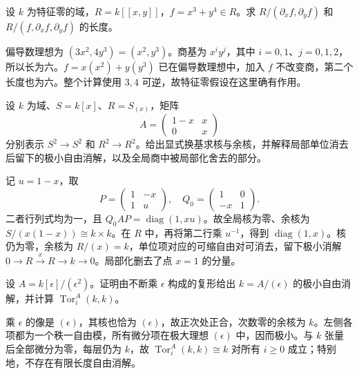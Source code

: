 \begin{exercise}\label{b3:ex:F-jacobian}
	设 \(k\) 为特征零的域，\(R=k[\![x,y]\!]\)，\(f=x^3+y^4\in R\)。求 \(R/(\partial_xf,\partial_yf)\) 和 \(R/(f,\partial_xf,\partial_yf)\) 的长度。
\end{exercise}
\begin{solution}
	偏导数理想为 \((3x^2,4y^3)=(x^2,y^3)\)。商基为 \(x^iy^j\)，其中 \(i=0,1\)、\(j=0,1,2\)，所以长为六。\(f=x(x^2)+y(y^3)\) 已在偏导数理想中，加入 \(f\) 不改变商，第二个长度也为六。整个计算使用 \(3,4\) 可逆，故特征零假设在这里确有作用。
\end{solution}

\begin{exercise}\label{b3:ex:F-module-unit}
	设 \(k\) 为域、\(S=k[x]\)、\(R=S_{(x)}\)，矩阵
	\[
		A=\begin{pmatrix}1-x&x\\0&x\end{pmatrix}
	\]
	分别表示 \(S^2\to S^2\) 和 \(R^2\to R^2\)。给出显式换基求核与余核，并解释局部单位消去后留下的极小自由消解，以及全局商中被局部化舍去的部分。
\end{exercise}
\begin{solution}
	记 \(u=1-x\)，取
	\[
		P=\begin{pmatrix}1&-x\\1&u\end{pmatrix},\quad
		Q_0=\begin{pmatrix}1&0\\-x&1\end{pmatrix}.
	\]
	二者行列式均为一，且 \(Q_0AP=\operatorname{diag}(1,xu)\)。故全局核为零、余核为 \(S/(x(1-x))\cong k\times k\)。在 \(R\) 中，再将第二行乘 \(u^{-1}\)，得到 \(\operatorname{diag}(1,x)\)。核仍为零，余核为 \(R/(x)=k\)，单位项对应的可缩自由对可消去，留下极小消解 \(0\to R\xrightarrow{x}R\to k\to0\)。局部化删去了点 \(x=1\) 的分量。
\end{solution}

\begin{exercise}\label{b3:ex:F-infinite-resolution}
	设 \(A=k[\epsilon]/(\epsilon^2)\)。证明由不断乘 \(\epsilon\) 构成的复形给出 \(k=A/(\epsilon)\) 的极小自由消解，并计算 \(\operatorname{Tor}_i^A(k,k)\)。
\end{exercise}
\begin{solution}
	乘 \(\epsilon\) 的像是 \((\epsilon)\)，其核也恰为 \((\epsilon)\)，故正次处正合，次数零的余核为 \(k\)。左侧各项都为一个秩一自由模，所有微分项在极大理想 \((\epsilon)\) 中，因而极小。与 \(k\) 张量后全部微分为零，每层仍为 \(k\)，故 \(\operatorname{Tor}_i^A(k,k)\cong k\) 对所有 \(i\ge0\) 成立；特别地，不存在有限长度自由消解。
\end{solution}

